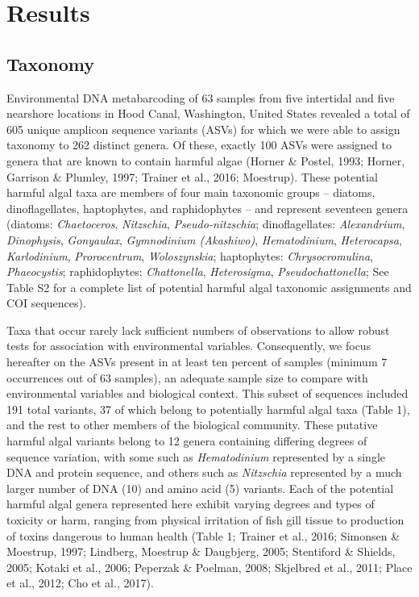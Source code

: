 \documentclass[
]{article}
\begin{document}
\hypertarget{results}{%
\section{Results}\label{results}}

\hypertarget{taxonomy-1}{%
\subsection{Taxonomy}\label{taxonomy-1}}

Environmental DNA metabarcoding of 63 samples from five intertidal and
five nearshore locations in Hood Canal, Washington, United States
revealed a total of 605 unique amplicon sequence variants (ASVs) for
which we were able to assign taxonomy to 262 distinct genera. Of these,
exactly 100 ASVs were assigned to genera that are known to contain
harmful algae (Horner \& Postel, 1993; Horner, Garrison \& Plumley,
1997; Trainer et al., 2016; Moestrup). These potential harmful algal
taxa are members of four main taxonomic groups -- diatoms,
dinoflagellates, haptophytes, and raphidophytes -- and represent
seventeen genera (diatoms: \emph{Chaetoceros}, \emph{Nitzschia},
\emph{Pseudo-nitzschia}; dinoflagellates: \emph{Alexandrium},
\emph{Dinophysis}, \emph{Gonyaulax}, \emph{Gymnodinium (Akashiwo)},
\emph{Hematodinium}, \emph{Heterocapsa}, \emph{Karlodinium},
\emph{Prorocentrum}, \emph{Woloszynskia}; haptophytes:
\emph{Chrysocromulina}, \emph{Phaeocystis}; raphidophytes:
\emph{Chattonella}, \emph{Heterosigma}, \emph{Pseudochattonella}; See
Table S2 for a complete list of potential harmful algal taxonomic
assignments and COI sequences).

Taxa that occur rarely lack sufficient numbers of observations to allow
robust tests for association with environmental variables. Consequently,
we focus hereafter on the ASVs present in at least ten percent of
samples (minimum 7 occurrences out of 63 samples), an adequate sample
size to compare with environmental variables and biological context.
This subset of sequences included 191 total variants, 37 of which belong
to potentially harmful algal taxa (Table 1), and the rest to other
members of the biological community. These putative harmful algal
variants belong to 12 genera containing differing degrees of sequence
variation, with some such as \emph{Hematodinium} represented by a single
DNA and protein sequence, and others such as \emph{Nitzschia}
represented by a much larger number of DNA (10) and amino acid (5)
variants. Each of the potential harmful algal genera represented here
exhibit varying degrees and types of toxicity or harm, ranging from
physical irritation of fish gill tissue to production of toxins
dangerous to human health (Table 1; Trainer et al., 2016; Simonsen \&
Moestrup, 1997; Lindberg, Moestrup \& Daugbjerg, 2005; Stentiford \&
Shields, 2005; Kotaki et al., 2006; Peperzak \& Poelman, 2008; Skjelbred
et al., 2011; Place et al., 2012; Cho et al., 2017).
\end{document}
